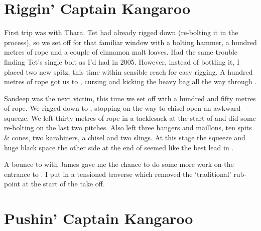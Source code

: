 \section{Riggin' Captain Kangaroo}


First trip was with Thara. Tet had already rigged down  (re-bolting
it in the process), so we set off for that familiar window with a
bolting hammer, a hundred metres of rope and a couple of cinnamon malt
loaves. Had the same trouble finding Tet's single bolt as I'd had in
2005. However, instead of bottling it, I placed two new spitz, this time
within sensible reach for easy rigging. A hundred metres of rope got us
to , cursing and kicking the heavy bag all the way
through .


Sandeep was the next victim, this time we set off with a hundred and
fifty metres of rope. We rigged down to , stopping on the
way to chisel open an awkward squeeze. We left thirty metres of rope in
a tacklesack at the start of  and did some re-bolting on the
last two pitches. Also left three hangers and maillons, ten spits \&
cones, two karabiners, a chisel and two slings. At this stage the
squeeze and huge black space the other side at the end of 
seemed like the best lead in .

A bounce to  with James gave me the chance to do some more work on
the entrance to . I put in a tensioned traverse which
removed the `traditional' rub-point at the start of the take off.



\section{Pushin' Captain Kangaroo}

